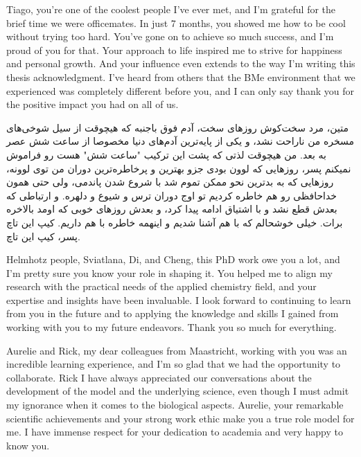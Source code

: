 Tiago, you're one of the coolest people I've ever met, and I'm grateful for the brief time we were officemates. In just 7 months, you showed me how to be cool without trying too hard. You've gone on to achieve so much success, and I'm proud of you for that. Your approach to life inspired me to strive for happiness and personal growth. And your influence even extends to the way I'm writing this thesis acknowledgment. I've heard from others that the BMe environment that we experienced was completely different before you, and I can only say thank you for the positive impact you had on all of us.

\begin{flushright}
\foreignlanguage{persian}
{
متین، مرد سخت‌کوش روزهای سخت، آدم فوق باجنبه که هیچوقت از سیل شوخی‌های مسخره من ناراحت نشد، و یکی از پایه‌ترین آدم‌های دنیا مخصوصا از ساعت شش عصر به بعد. من هیچوقت لذتی که پشت این ترکیب "ساعت شش" هست رو فراموش نمیکنم پسر، روزهایی که لوون بودی جزو بهترین و پرخاطره‌ترین دوران من توی لوونه، روزهایی که به بدترین نحو ممکن تموم شد با شروع شدن پاندمی، ولی حتی همون خداحافظی رو هم خاطره کردیم تو اوج دوران ترس و شیوع و دلهره. و ارتباطی که بعدش قطع نشد و با اشتیاق ادامه پیدا کرد، و بعدش روزهای خوبی که اومد بالاخره برات. خیلی خوشحالم که با هم آشنا شدیم و اینهمه خاطره با هم داریم. کیپ این تاچ پسر، کیپ این تاچ.
}
\end{flushright}

Helmhotz people, Sviatlana, Di, and Cheng, this PhD work owe you a lot, and I'm pretty sure you know your role in shaping it. You helped me to align my research with the practical needs of the applied chemistry field, and your expertise and insights have been invaluable. I look forward to continuing to learn from you in the future and to applying the knowledge and skills I gained from working with you to my future endeavors. Thank you so much for everything.

Aurelie and Rick, my dear colleagues from Maastricht, working with you was an incredible learning experience, and I'm so glad that we had the opportunity to collaborate. Rick I have always appreciated our conversations about the development of the model and the underlying science, even though I must admit my ignorance when it comes to the biological aspects. Aurelie, your remarkable scientific achievements and your strong work ethic make you a true role model for me. I have immense respect for your dedication to academia and very happy to know you.

